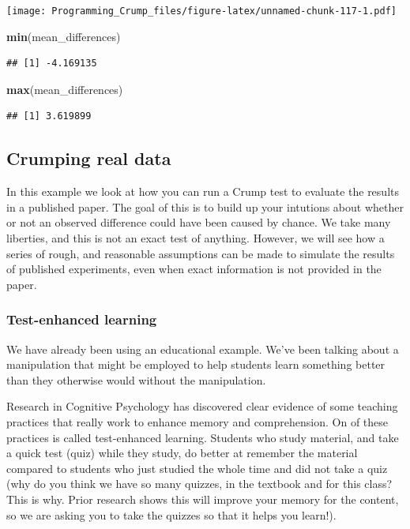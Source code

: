 \documentclass[]{book}
\newenvironment{Shaded}{\begin{snugshade}}{\end{snugshade}}
\newcommand{\KeywordTok}[1]{\textcolor[rgb]{0.13,0.29,0.53}{\textbf{{#1}}}}
\newcommand{\NormalTok}[1]{{#1}}
\theoremstyle{definition}
\theoremstyle{definition}
\theoremstyle{definition}
\theoremstyle{remark}
\begin{document}
\texttt{[image: Programming\_Crump\_files/figure-latex/unnamed-chunk-117-1.pdf]}

\begin{Shaded}
\begin{Highlighting}[]
\KeywordTok{min}\NormalTok{(mean_differences)}
\end{Highlighting}
\end{Shaded}

\begin{verbatim}
## [1] -4.169135
\end{verbatim}

\begin{Shaded}
\begin{Highlighting}[]
\KeywordTok{max}\NormalTok{(mean_differences)}
\end{Highlighting}
\end{Shaded}

\begin{verbatim}
## [1] 3.619899
\end{verbatim}

\subsection{Crumping real data}\label{crumping-real-data}

In this example we look at how you can run a Crump test to evaluate the
results in a published paper. The goal of this is to build up your
intutions about whether or not an observed difference could have been
caused by chance. We take many liberties, and this is not an exact test
of anything. However, we will see how a series of rough, and reasonable
assumptions can be made to simulate the results of published
experiments, even when exact information is not provided in the paper.

\subsubsection{Test-enhanced learning}\label{test-enhanced-learning}

We have already been using an educational example. We've been talking
about a manipulation that might be employed to help students learn
something better than they otherwise would without the manipulation.

Research in Cognitive Psychology has discovered clear evidence of some
teaching practices that really work to enhance memory and comprehension.
On of these practices is called test-enhanced learning. Students who
study material, and take a quick test (quiz) while they study, do better
at remember the material compared to students who just studied the whole
time and did not take a quiz (why do you think we have so many quizzes,
in the textbook and for this class? This is why. Prior research shows
this will improve your memory for the content, so we are asking you to
take the quizzes so that it helps you learn!).
\end{document}
